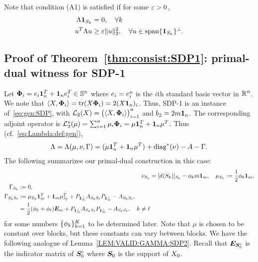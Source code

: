 Note that condition (A1) is satisfied if for some $\varepsilon > 0$,
\begin{align}
  \label{eq:A1:equiv:1}  \Lambda \bm{1}_{S_{k}} &= 0, \quad \forall k\\
  \label{eq:A1:equiv:2} u^T \Lambda u &\ge \varepsilon \|u\|_2^2, \quad \forall u \in \operatorname{span}\{\bm{1}_{S_{k}}\}^\perp.
\end{align}




\subsection{Proof of Theorem~\ref{thm:consist:SDP1}: primal-dual witness for SDP-1}\label{sec:proof:consist:SDP1}
Let $\bm{\Phi}_i = e_{i} \bm{1}_n^T + \bm{1}_n e_{i}^T \in \mathbb{S}^{n}$ where $e_{i} = e_{i}^{n}$ is the $i$th standard basis vector in $\mathbb{R}^n$. We note that $\langle X,\bm{\Phi}_i\rangle = \operatorname*{tr}(X\bm{\Phi}_i)= 2(X \bm{1}_n)_i$. Thus, SDP-1 is an instance of~\eqref{eq:gen:SDP}, with $\mathcal{L}_2(X) = \big( \langle X,\bm{\Phi}_i\rangle \big)_{i=1}^n$  and $b_2 = 2 m \bm{1}_n$.
The corresponding adjoint operator is
  $\mathcal{L}_2^*(\mu) = \sum_{i=1}^n \mu_i \bm{\Phi}_i  = \mu \bm{1}_n^T + \bm{1}_n \mu^T$.
Thus (cf.~\eqref{eq:Lambda:def:gen}),
\begin{align}
  \Lambda = \Lambda(\mu,\nu,\Gamma) = (\mu \bm{1}_n^T + \bm{1}_n \mu^T) + \operatorname{diag}^*(\nu) -A - \Gamma.
\end{align}
The following summarizes our primal-dual construction in this case:
\begin{align}
\nu_{\subb{k}} &= [\dg{}{k}]_{\subb{k}} - \mubar_k m \onev_m, \label{eq:nu:def:SDP1} 
\quad \mu_{\subb{k}} := \frac12 \mubar_k \onev_m, \\ %
\begin{split}
  \label{eq:Gamma:def:SDP1}
  \Gamma_{\subb{k}} &:= 0,  \\
  \Gamma_{\subb{k}\subb{\ell}} &:= 
     \mu_{\subb{k}} \onev_m^T + \onev_m \mu_{\subb{\ell}}^T  + \projonep A_{\subb{k}\subb{\ell}} \projonep - A_{\subb{k}\subb{\ell}},  \\
     &= \frac12(\mubar_k + \mubar_\ell) \onem_m   + \projonep A_{\subb{k}\subb{\ell}} \projonep - A_{\subb{k}\subb{\ell}},
      \quad k \neq \ell
\end{split}
\end{align}
for some numbers $\{\phi_k\}_{k=1}^K$ to be determined later. Note that $\mu$ is chosen to be constant over blocks, but these constants can vary between blocks. We have the following analogue of Lemma~\ref{LEM:VALID:GAMMA:SDP2}. Recall that $\bm{E}_{\bm{S}_0^c}$ is the indicator matrix of $\bm{S}_0^c$ where $\bm{S}_0$ is the support of $X_0$.

